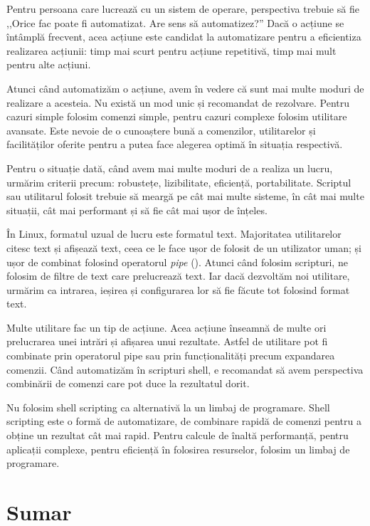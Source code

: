 Pentru persoana care lucrează cu un sistem de operare, perspectiva trebuie să fie ,,Orice fac poate fi automatizat. Are sens să automatizez?''
Dacă o acțiune se întâmplă frecvent, acea acțiune este candidat la automatizare pentru a eficientiza realizarea acțiunii: timp mai scurt pentru acțiune repetitivă, timp mai mult pentru alte acțiuni.

Atunci când automatizăm o acțiune, avem în vedere că sunt mai multe moduri de realizare a acesteia.
Nu există un mod unic și recomandat de rezolvare.
Pentru cazuri simple folosim comenzi simple, pentru cazuri complexe folosim utilitare avansate.
Este nevoie de o cunoaștere bună a comenzilor, utilitarelor și facilităților oferite pentru a putea face alegerea optimă în situația respectivă.

Pentru o situație dată, când avem mai multe moduri de a realiza un lucru, urmărim criterii precum: robustețe, lizibilitate, eficiență, portabilitate.
Scriptul sau utilitarul folosit trebuie să meargă pe cât mai multe sisteme, în cât mai multe situații, cât mai performant și să fie cât mai ușor de înțeles.

În Linux, formatul uzual de lucru este formatul text.
Majoritatea utilitarelor citesc text și afișează text, ceea ce le face ușor de folosit de un utilizator uman; și ușor de combinat folosind operatorul \textit{pipe} (\texttt{\textbar}).
Atunci când folosim scripturi, ne folosim de filtre de text care prelucrează text.
Iar dacă dezvoltăm noi utilitare, urmărim ca intrarea, ieșirea și configurarea lor să fie făcute tot folosind format text.

Multe utilitare fac un tip de acțiune.
Acea acțiune înseamnă de multe ori prelucrarea unei intrări și afișarea unui rezultate.
Astfel de utilitare pot fi combinate prin operatorul pipe sau prin funcționalități precum expandarea comenzii.
Când automatizăm în scripturi shell, e recomandat să avem perspectiva combinării de comenzi care pot duce la rezultatul dorit.

Nu folosim shell scripting ca alternativă la un limbaj de programare.
Shell scripting este o formă de automatizare, de combinare rapidă de comenzi pentru a obține un rezultat cât mai rapid.
Pentru calcule de înaltă performanță, pentru aplicații complexe, pentru eficiență în folosirea resurselor, folosim un limbaj de programare.

\section{Sumar}
\label{sec:auto:summary}

